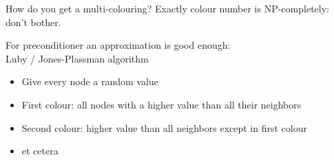 \begin{frame}{How do you get a multi-colouring?}
  Exactly colour number is NP-completely: don't bother.

  For preconditioner an approximation is good enough:\\
  Luby / Jones-Plassman algorithm
  \begin{itemize}
  \item Give every node a random value
  \item First colour: all nodes with a higher value than all their neighbors
  \item Second colour: higher value than all neighbors except in first colour
  \item et cetera
  \end{itemize}
\end{frame}

